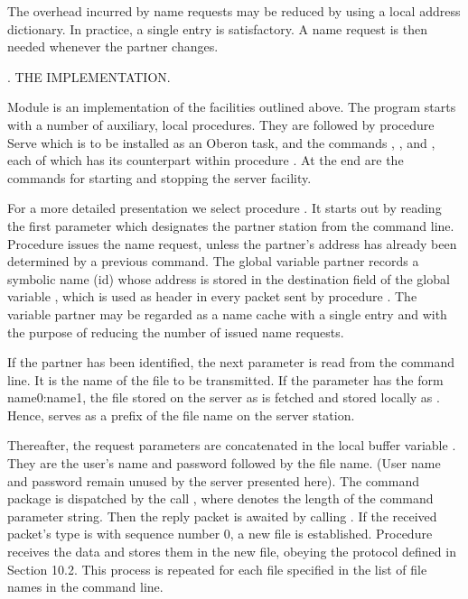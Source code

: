 \noindent The overhead incurred by name requests may be reduced by using a local address dictionary. In practice, a single entry is satisfactory. A name request is then needed whenever the partner changes.

. THE IMPLEMENTATION.

Module  is an implementation of the facilities outlined above. The program starts with a number of auxiliary, local procedures. They are followed by procedure Serve which is to be installed as an Oberon task, and the commands , , and , each of which has its counterpart within procedure . At the end are the commands for starting and stopping the server facility.

For a more detailed presentation we select procedure . It starts out by reading the first parameter which designates the partner station from the command line. Procedure  issues the name request, unless the partner's address has already been determined by a previous command. The global variable partner records a symbolic name (id) whose address is stored in the destination field of the global variable , which is used as header in every packet sent by procedure . The variable partner may be regarded as a name cache with a single entry and with the purpose of reducing the number of issued name requests.

If the partner has been identified, the next parameter is read from the command line. It is the name of the file to be transmitted. If the parameter has the form name0:name1, the file stored on the server as  is fetched and stored locally as . Hence,  serves as a prefix of the file name on the server station.

Thereafter, the request parameters are concatenated in the local buffer variable . They are the user's name and password followed by the file name. (User name and password remain unused by the server presented here). The command package is dispatched by the call , where  denotes the length of the command parameter string. Then the reply packet is awaited by calling . If the received packet's type is  with sequence number 0, a new file is established. Procedure  receives the data and stores them in the new file, obeying the protocol defined in Section 10.2. This process is repeated for each file specified in the list of file names in the command line.

